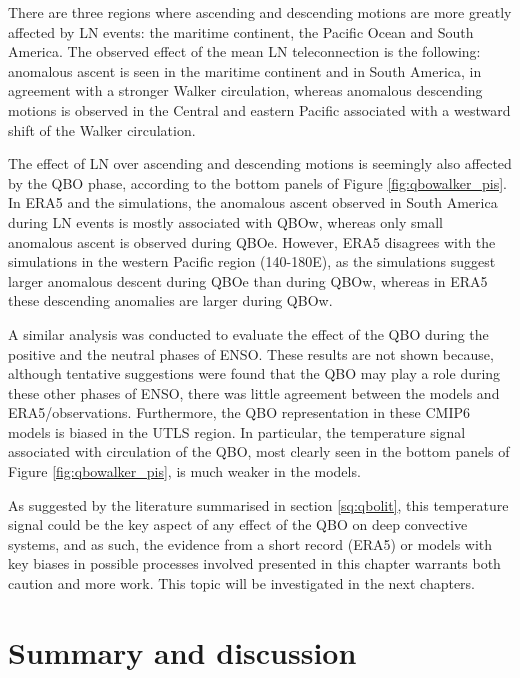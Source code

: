 There are three regions where ascending and descending motions are more greatly affected by LN events: the maritime continent, the Pacific Ocean and South America. The observed effect of the mean LN teleconnection is the following: anomalous ascent is seen in the maritime continent and in South America, in agreement with a stronger Walker circulation, whereas anomalous descending motions is observed in the Central and eastern Pacific associated with a westward shift of the Walker circulation. 


The effect of LN over ascending and descending motions is seemingly also affected by the QBO phase, according to the bottom panels of Figure \ref{fig:qbowalker_pis}. In ERA5 and the simulations, the anomalous ascent observed in South America during LN events is mostly associated with QBOw, whereas only small anomalous ascent is observed during QBOe. 
However, ERA5 disagrees with the simulations in the western Pacific region (140-180E), as the simulations suggest larger anomalous descent during QBOe than during QBOw, whereas in ERA5 these descending anomalies are larger during QBOw. 

A similar analysis was conducted to evaluate the effect of the QBO during the positive and the neutral phases of ENSO. These results are not shown because, although tentative suggestions were found that the QBO may play a role during these other phases of ENSO, there was little agreement between the models and ERA5/observations. Furthermore, the QBO representation in these CMIP6 models is biased in the UTLS region. In particular, the temperature signal associated with circulation of the QBO, most clearly seen in the bottom panels of Figure \ref{fig:qbowalker_pis}, is much weaker in the models. 

As suggested by the literature summarised in section \ref{sq:qbolit}, this temperature signal could be the key aspect of any effect of the QBO on deep convective systems, and as such, the evidence from a short record (ERA5) or models with key biases in possible processes involved presented in this chapter warrants both caution and more work. 
This topic will be investigated in the next chapters.

\section{Summary and discussion}



